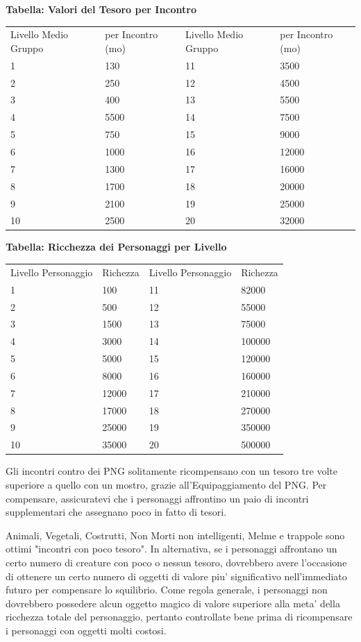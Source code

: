 \documentclass[a4paper,11pt,twoside,openany]{dndbook}
\begin{document}
{\bigskip

\textbf{Tabella: Valori del Tesoro per Incontro}

\begin{tabular}[c]{@{}llll@{}}
\toprule 
Livello Medio Gruppo & per Incontro (mo) & Livello Medio Gruppo & per Incontro (mo)\tabularnewline
1 & 130 & 11 & 3500\tabularnewline
2 & 250 & 12 & 4500\tabularnewline
3 & 400 & 13 & 5500\tabularnewline
4 & 5500 & 14 & 7500\tabularnewline
5 & 750 & 15 & 9000\tabularnewline
6 & 1000 & 16 & 12000\tabularnewline
7 & 1300 & 17 & 16000\tabularnewline
8 & 1700 & 18 & 20000\tabularnewline
9 & 2100 & 19 & 25000\tabularnewline
10 & 2500 & 20 & 32000\tabularnewline
\bottomrule
\end{tabular}
\bigskip

\textbf{Tabella: Ricchezza dei Personaggi per Livello}

\bigskip

\begin{tabular}[c]{@{}llll@{}}
\toprule 
Livello Personaggio & Richezza & Livello Personaggio & Richezza\tabularnewline
1 & 100 & 11 & 82000\tabularnewline
2 & 500 & 12 & 55000\tabularnewline
3 & 1500 & 13 & 75000\tabularnewline
4 & 3000 & 14 & 100000\tabularnewline
5 & 5000 & 15 & 120000\tabularnewline
6 & 8000 & 16 & 160000\tabularnewline
7 & 12000 & 17 & 210000\tabularnewline
8 & 17000 & 18 & 270000\tabularnewline
9 & 25000 & 19 & 350000\tabularnewline
10 & 35000 & 20 & 500000\tabularnewline
\bottomrule
\end{tabular}

\bigskip

Gli incontri contro dei PNG solitamente ricompensano con un tesoro
tre volte superiore a quello con un mostro, grazie all'Equipaggiamento
del PNG. Per compensare, assicuratevi che i personaggi affrontino
un paio di incontri supplementari che assegnano poco in fatto di tesori.

Animali, Vegetali, Costrutti, Non Morti non intelligenti, Melme e trappole sono ottimi "incontri con poco tesoro". In alternativa, se i personaggi affrontano un certo numero di creature con poco o nessun tesoro, dovrebbero avere l'occasione di ottenere un certo numero di oggetti di valore piu' significativo nell'immediato futuro per compensare lo squilibrio. Come regola generale, i personaggi non dovrebbero possedere alcun oggetto magico di valore superiore alla meta' della ricchezza totale del personaggio, pertanto controllate bene prima di ricompensare i personaggi con oggetti molti costosi.

}
\end{document}
